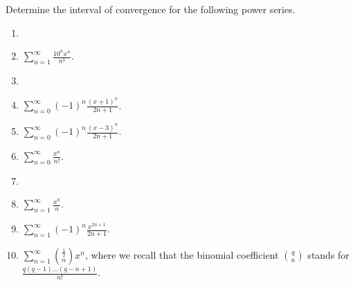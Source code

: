 Determine the interval of convergence for the following power series. 
\begin{enumerate}[ref={\fcProblemRef}]
\item 
\item $\displaystyle \sum \limits_{n= 1}^{\infty} \frac{ 10^nx^n}{n^3}$.

\item 
\item $\displaystyle \sum\limits_{n=0}^{\infty}(-1)^n \frac{(x+1)^n }{ 2n+1} $.

\answer{$x\in (-2, 0]$.}
\item $\displaystyle \sum\limits_{n=0}^{\infty}(-1)^n \frac{(x- 3)^n }{ 2n+1} $.

\answer{$x\in (2, 4]$.}
\item $\displaystyle \sum\limits_{n=0}^{\infty} \frac{x^n}{n!}$.

\item 
\item $\displaystyle \sum\limits_{n=1}^{\infty} \frac{x^n}{n}$.

\answer{converges for $x\in[-1,1)$.}
\item $\displaystyle\sum \limits_{n=1}^{\infty} (-1)^n\frac{x^{2n+1}}{2n+1}$.

\item $\displaystyle \sum\limits_{n=1}^{\infty} \binom{\frac{1}{2}}{n}x^{n}$, where we recall that the binomial coefficient $\displaystyle \binom{q}{n}$ stands for $\displaystyle\frac{q (q-1)\dots (q-n+1)}{n!}$.

\answer{converges for $x\in (-1,1]$. } 
\end{enumerate}